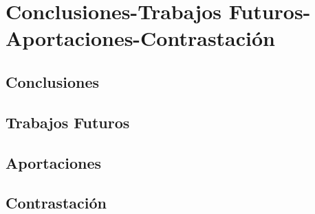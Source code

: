 \chapter{Conclusiones-Trabajos Futuros-Aportaciones-Contrastación}

\section{Conclusiones}
\newpage

\section{Trabajos Futuros}
\newpage

\section{Aportaciones}
\newpage

\section{Contrastación}
\newpage